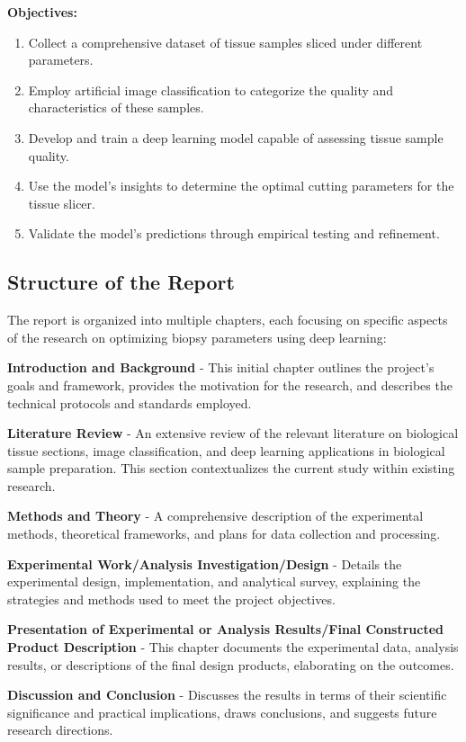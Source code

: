 \textbf{Objectives:}

\begin{enumerate}
    \item Collect a comprehensive dataset of tissue samples sliced under different parameters.
    \item Employ artificial image classification to categorize the quality and characteristics of these samples.
    \item Develop and train a deep learning model capable of assessing tissue sample quality.
    \item Use the model's insights to determine the optimal cutting parameters for the tissue slicer.
    \item Validate the model's predictions through empirical testing and refinement.
\end{enumerate}


\subsection{Structure of the Report}
The report is organized into multiple chapters, each focusing on specific aspects of the research on optimizing biopsy parameters using deep learning:

\textbf{Introduction and Background} - This initial chapter outlines the project's goals and framework, provides the motivation for the research, and describes the technical protocols and standards employed.

\textbf{Literature Review} - An extensive review of the relevant literature on biological tissue sections, image classification, and deep learning applications in biological sample preparation. This section contextualizes the current study within existing research.

\textbf{Methods and Theory} - A comprehensive description of the experimental methods, theoretical frameworks, and plans for data collection and processing.

\textbf{Experimental Work/Analysis Investigation/Design} - Details the experimental design, implementation, and analytical survey, explaining the strategies and methods used to meet the project objectives.

\textbf{Presentation of Experimental or Analysis Results/Final Constructed Product Description} - This chapter documents the experimental data, analysis results, or descriptions of the final design products, elaborating on the outcomes.

\textbf{Discussion and Conclusion} - Discusses the results in terms of their scientific significance and practical implications, draws conclusions, and suggests future research directions.

